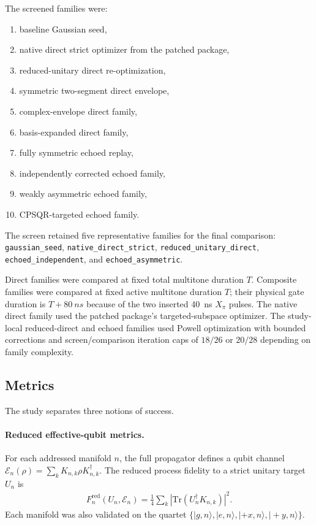 \documentclass[aps,pra,twocolumn,reprint,floatfix,amsmath,amssymb]{revtex4-2}
\begin{document}
The screened families were:
\begin{enumerate}
    \item baseline Gaussian seed,
    \item native direct strict optimizer from the patched package,
    \item reduced-unitary direct re-optimization,
    \item symmetric two-segment direct envelope,
    \item complex-envelope direct family,
    \item basis-expanded direct family,
    \item fully symmetric echoed replay,
    \item independently corrected echoed family,
    \item weakly asymmetric echoed family,
    \item CPSQR-targeted echoed family.
\end{enumerate}
The screen retained five representative families for the final comparison: \texttt{gaussian\_seed}, \texttt{native\_direct\_strict}, \texttt{reduced\_unitary\_direct}, \texttt{echoed\_independent}, and \texttt{echoed\_asymmetric}.

Direct families were compared at fixed total multitone duration $T$. Composite families were compared at fixed active multitone duration $T$; their physical gate duration is $T+\SI{80}{ns}$ because of the two inserted \SI{40}{ns} $X_\pi$ pulses. The native direct family used the patched package's targeted-subspace optimizer. The study-local reduced-direct and echoed families used Powell optimization with bounded corrections and screen/comparison iteration caps of $18/26$ or $20/28$ depending on family complexity.

\subsection{Metrics}
The study separates three notions of success.

\paragraph{Reduced effective-qubit metrics.}
For each addressed manifold $n$, the full propagator defines a qubit channel $\mathcal{E}_n(\rho)=\sum_k K_{n,k}\rho K_{n,k}^\dagger$. The reduced process fidelity to a strict unitary target $U_n$ is
\begin{align}
F_n^{\mathrm{red}}(U_n,\mathcal{E}_n)
=
\frac{1}{4}\sum_k \left|\mathrm{Tr}(U_n^\dagger K_{n,k})\right|^2.
\label{eq:reduced_process}
\end{align}
Each manifold was also validated on the quartet $\{|g,n\rangle,|e,n\rangle,|+x,n\rangle,|+y,n\rangle\}$.
\end{document}
